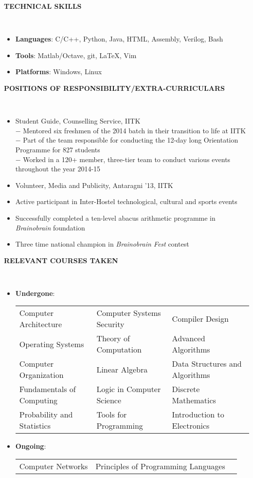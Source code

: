 \documentclass[a4paper,10pt]{article}
\newcommand{\isep}{-2 pt}
\newcommand{\lsep}{-0.5cm}
\newcommand{\resheading}[1]{{\small \colorbox{mygrey}{\begin{minipage}{0.975\textwidth}{\textbf{#1 \vphantom{p\^{E}}}}\end{minipage}}}}
\begin{document}
\resheading{\textbf{TECHNICAL SKILLS} }\\[\lsep]
\begin{itemize}\itemsep\isep
\item \noindent \textbf{Languages}: C/C++, Python, Java, HTML, Assembly, Verilog, Bash
\item \noindent \textbf{Tools}: Matlab/Octave, git, \LaTeX, Vim
\item \noindent \textbf{Platforms}: Windows, Linux
\end{itemize}

\resheading{\textbf{POSITIONS OF RESPONSIBILITY/EXTRA-CURRICULARS} }\\[\lsep]
\begin{itemize}\itemsep \isep
\item \noindent Student Guide, Counselling Service, IITK\\
$-$ Mentored six freshmen of the 2014 batch in their transition to life at IITK\\
$-$ Part of the team responsible for conducting the 12-day long Orientation Programme for 827 students\\
$-$ Worked in a 120+ member, three-tier team to conduct various events throughout the year 2014-15
\item \noindent Volunteer, Media and Publicity, Antaragni '13, IITK
\item \noindent Active participant in Inter-Hostel technological, cultural and sports events
\item \noindent Successfully completed a ten-level abacus arithmetic programme in \emph{Brainobrain} foundation
\item \noindent Three time national champion in \emph{Brainobrain Fest} contest
\end{itemize}

\resheading{\textbf{RELEVANT COURSES TAKEN} }\\[\lsep]
\begin{itemize}
\item \textbf{Undergone}:\\
\begin{tabular}{ L{6.7cm} L{6.7cm} L{6.7cm} }
Computer Architecture & Computer Systems Security & Compiler Design\\
Operating Systems & Theory of Computation & Advanced Algorithms\\
Computer Organization & Linear Algebra & Data Structures and Algorithms\\
Fundamentals of Computing & Logic in Computer Science & Discrete Mathematics\\
Probability and Statistics & Tools for Programming & Introduction to Electronics
\end{tabular}

\newpage

\item \textbf{Ongoing}:\\
\begin{tabular}{ L{6.7cm} L{6.7cm} L{6.7cm} }
Computer Networks & Principles of Programming Languages & \\
\end{tabular}
\end{itemize}
\end{document}
